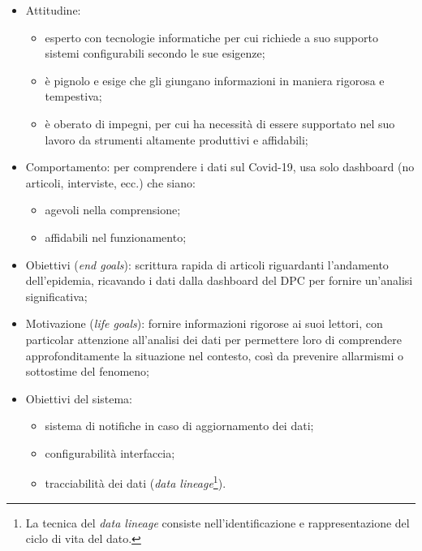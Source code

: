 \begin{itemize}
	\item Attitudine:
	\begin{itemize}
        \item esperto con tecnologie informatiche per cui richiede a suo supporto sistemi configurabili secondo le sue esigenze;
        \item è pignolo e esige che gli giungano informazioni in maniera rigorosa e tempestiva;
        \item è oberato di impegni, per cui ha necessità di essere supportato nel suo lavoro da strumenti altamente produttivi e affidabili;
    \end{itemize}
    \item Comportamento: per comprendere i dati sul Covid-19, usa solo dashboard (no articoli, interviste, ecc.) che siano:
	\begin{itemize}
	    \item agevoli nella comprensione;
	    \item affidabili nel funzionamento;
    \end{itemize}
	\item Obiettivi (\textit{end goals}): scrittura rapida di articoli riguardanti l'andamento dell'epidemia, ricavando i dati dalla dashboard del DPC per fornire un'analisi significativa;
	\item Motivazione (\textit{life goals}): fornire informazioni rigorose ai suoi lettori, con particolar attenzione all'analisi dei dati per permettere loro di comprendere approfonditamente la situazione nel contesto, così da prevenire allarmismi o sottostime del fenomeno;
	\item Obiettivi del sistema:
	\begin{itemize}
	    \item sistema di notifiche in caso di aggiornamento dei dati;
	    \item configurabilità interfaccia;
	    \item tracciabilità dei dati (\textit{data lineage}\footnote{La tecnica del \textit{data lineage} consiste nell’identificazione e rappresentazione del ciclo di vita del dato.}).
    \end{itemize}
\end{itemize}